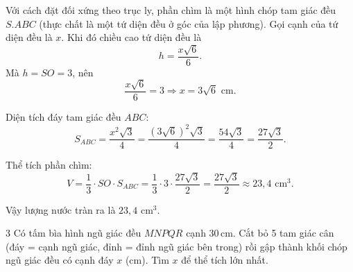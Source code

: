 \begin{loigiai}
{\par}

Với cách đặt đối xứng theo trục ly, phần chìm là một hình chóp tam giác đều $S.ABC$ (thực chất là một tứ diện đều ở góc của lập phương).  
Gọi cạnh của tứ diện đều là $x$. Khi đó chiều cao tứ diện đều là
\[
h=\frac{x\sqrt6}{6}.
\]
Mà $h=SO=3$, nên
\[
\frac{x\sqrt6}{6}=3 \Rightarrow x=3\sqrt6\text{ cm}.
\]

Diện tích đáy tam giác đều $ABC$:
\[
S_{ABC}=\frac{x^2\sqrt3}{4}
=\frac{(3\sqrt6)^2\sqrt3}{4}
=\frac{54\sqrt3}{4}
=\frac{27\sqrt3}{2}.
\]

Thể tích phần chìm:
\[
V=\frac13\cdot SO\cdot S_{ABC}
=\frac13\cdot 3\cdot \frac{27\sqrt3}{2}
=\frac{27\sqrt3}{2}\approx 23{,}4\text{ cm}^3.
\]

Vậy lượng nước tràn ra là $\boxed{23{,}4\text{ cm}^3}$.
\end{loigiai}

\separator

\begin{baitoan}{3 \hfill {}}
Có tấm bìa hình ngũ giác đều $MNPQR$ cạnh 30\,cm. Cắt bỏ 5 tam giác cân (đáy = cạnh ngũ giác, đỉnh = đỉnh ngũ giác bên trong) rồi gập thành khối chóp ngũ giác đều có cạnh đáy $x$ (cm). Tìm $x$ để thể tích lớn nhất.
\end{baitoan}

